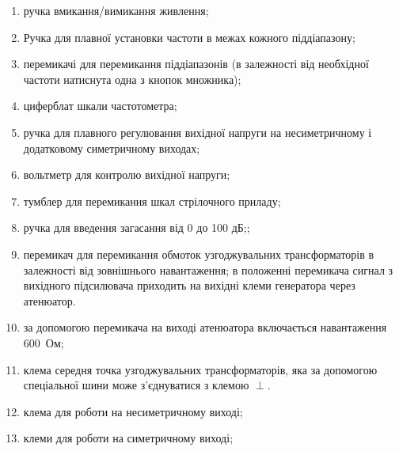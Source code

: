 \begin{enumerate}
    \item \label{btn:powerGZ56} ручка вмикання/вимикання живлення;
    \item \label{btn:fHz} Ручка \circled{\ref{btn:fHz}}  для плавної установки частоти в межах кожного піддіапазону;
    \item \label{btn:fMulyiply} перемикачі \circled{\ref{btn:fMulyiply}}  для перемикання піддіапазонів (в залежності від необхідної частоти натиснута одна з кнопок множника);
    \item \label{scale:freq} циферблат шкали частотометра;
    \item \label{btn:regexit} ручка  \circled{\ref{btn:regexit}}  для плавного регулювання вихідної напруги на несиметричному і додатковому симетричному виходах;
    \item \label{scale:Vscale} вольтметр для контролю вихідної напруги;
    \item \label{btn:Vscale}тумблер \circled{\ref{btn:Vscale}}  для перемикання шкал стрілочного приладу;
     \item \label{btn:VscaleLim} ручка  для введення загасання від 0 до 100 дБ;;
    \item \label{btn:ExtR} перемикач \circled{\ref{btn:ExtR}}  для перемикання обмоток узгоджувальних трансформаторів в залежності від зовнішнього навантаження; в положенні перемикача  сигнал з вихідного підсилювача приходить на вихідні клеми генератора через атенюатор.
    \item \label{btn:IntR}за допомогою перемикача \circled{\ref{btn:IntR}}  на виході атенюатора включається навантаження $600$~Ом;
    \item клема  середня точка узгоджувальних трансформаторів, яка за допомогою спеціальної шини може з'єднуватися з клемою $\perp$.
    \item клема   для роботи на несиметричному виході;
    \item  клеми   для роботи на симетричному виході;
\end{enumerate}

